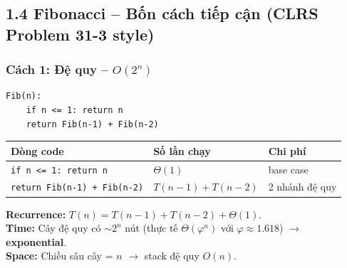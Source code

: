 \documentclass[10pt]{article}
\begin{document}
\subsection{1.4 Fibonacci -- Bốn cách tiếp cận (CLRS Problem 31-3
style)}\label{fibonacci-bux1ed1n-cuxe1ch-tiux1ebfp-cux1eadn-clrs-problem-31-3-style}

\subsubsection{\texorpdfstring{Cách 1: Đệ quy --
\(O(2^n)\)}{Cách 1: Đệ quy -- O(2\^{}n)}}\label{cuxe1ch-1-ux111ux1ec7-quy-o2n}

\begin{tcolorbox}[colback=gray!8, colframe=gray!50, boxrule=0.5pt, arc=2pt,
  left=6pt, right=6pt, top=4pt, bottom=4pt,
  title={\small\textbf{Pseudocode 1: Fibonacci -- Đệ quy}}]
\begin{verbatim}
Fib(n):
    if n <= 1: return n
    return Fib(n-1) + Fib(n-2)
\end{verbatim}
\end{tcolorbox}

\begin{tcolorbox}[colback=yellow!5, colframe=orange!50, boxrule=0.5pt, arc=2pt, title={\small\textbf{Phân tích Complexity -- Fibonacci Đệ quy}}]
\begin{tabular}{|l|l|l|}
\hline
\textbf{Dòng code} & \textbf{Số lần chạy} & \textbf{Chi phí} \\
\hline
\texttt{if n <= 1: return n} & $\Theta(1)$ & base case \\
\hline
\texttt{return Fib(n-1) + Fib(n-2)} & $T(n-1)+T(n-2)$ & 2 nhánh đệ quy \\
\hline
\end{tabular}
\vspace{0.2cm}

\textbf{Recurrence:} $T(n) = T(n-1) + T(n-2) + \Theta(1)$.\\
\textbf{Time:} Cây đệ quy có $\sim 2^n$ nút (thực tế $\Theta(\varphi^n)$ với $\varphi\approx1.618$) $\to$ \textbf{exponential}.\\
\textbf{Space:} Chiều sâu cây = $n$ $\to$ stack đệ quy $O(n)$.
\end{tcolorbox}
\end{document}
